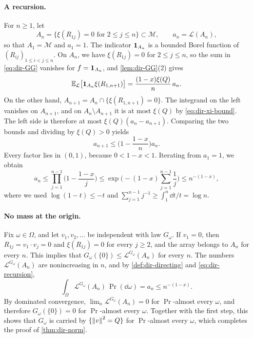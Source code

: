 \paragraph{A recursion.} For $n\ge1$, let
\[
A_n=\big\{\xi(R_{1j})=0\text{ for }2\le j\le n\big\}\subset\mathcal M,\qquad a_n=\mathcal L(A_n),
\]
so that $A_1=\mathcal M$ and $a_1=1$. The indicator $\mathbf 1_{A_n}$ is a bounded Borel function of $(R_{ij})_{1\le i<j\le n}$. On $A_n$, we have $\xi(R_{1j})=0$ for $2\le j\le n$, so the sum in \eqref{eq:dir-GG} vanishes for $f=\mathbf 1_{A_n}$, and \cref{lem:dir-GG}(2) gives
\[
\mathbb E_{\mathcal L}\big[\mathbf 1_{A_n}\xi(R_{1,n+1})\big]=\frac{(1-x)\xi(Q)}n\,a_n.
\]
On the other hand, $A_{n+1}=A_n\cap\{\xi(R_{1,n+1})=0\}$. The integrand on the left vanishes on $A_{n+1}$, and on $A_n\setminus A_{n+1}$ it is at most $\xi(Q)$ by \eqref{eq:dir-xi-bound}. The left side is therefore at most $\xi(Q)(a_n-a_{n+1})$. Comparing the two bounds and dividing by $\xi(Q)>0$ yields
\[
a_{n+1}\le\Big(1-\frac{1-x}n\Big)a_n.
\]
Every factor lies in $(0,1)$, because $0<1-x<1$. Iterating from $a_1=1$, we obtain
\begin{equation}\label{eq:dir-recursion}
a_n\le\prod_{j=1}^{n-1}\Big(1-\frac{1-x}j\Big)\le\exp\Big(-(1-x)\sum_{j=1}^{n-1}\frac1j\Big)\le n^{-(1-x)},
\end{equation}
where we used $\log(1-t)\le-t$ and $\sum_{j=1}^{n-1}j^{-1}\ge\int_1^n\dd t/t=\log n$.

\paragraph{No mass at the origin.} Fix $\omega\in\Omega$, and let $v_1,v_2,\dots$ be independent with law $G_\omega$. If $v_1=0$, then $R_{1j}=v_1\cdot v_j=0$ and $\xi(R_{1j})=0$ for every $j\ge2$, and the array belongs to $A_n$ for every $n$. This implies that $G_\omega(\{0\})\le\mathcal L^{G_\omega}(A_n)$ for every $n$. The numbers $\mathcal L^{G_\omega}(A_n)$ are nonincreasing in $n$, and by \cref{def:dir-directing} and \eqref{eq:dir-recursion},
\[
\int_\Omega\mathcal L^{G_\omega}(A_n)\,\Pr(\dd\omega)=a_n\le n^{-(1-x)}.
\]
By dominated convergence, $\lim_n\mathcal L^{G_\omega}(A_n)=0$ for $\Pr$-almost every $\omega$, and therefore $G_\omega(\{0\})=0$ for $\Pr$-almost every $\omega$. Together with the first step, this shows that $G_\omega$ is carried by $\{\left\lVert v\right\rVert^2=Q\}$ for $\Pr$-almost every $\omega$, which completes the proof of \cref{thm:dir-norm}.
